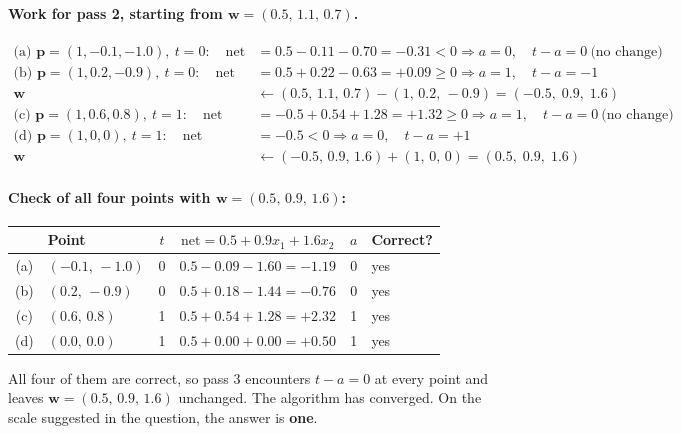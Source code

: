 \documentclass[11pt]{article}
\newcommand{\net}{\mathrm{net}}
\newcommand{\bw}{\mathbf{w}}
\newcommand{\bp}{\mathbf{p}}
\begin{document}
\paragraph{Work for pass 2, starting from $\bw = (0.5,\,1.1,\,0.7)$.}

\begin{align*}
\text{(a) } \bp=(1,-0.1,-1.0),\ t=0:\quad
\net &= 0.5 - 0.11 - 0.70 = -0.31 < 0 \Rightarrow a=0,\quad t-a=0 \ \text{(no change)}\\[4pt]
\text{(b) } \bp=(1,0.2,-0.9),\ t=0:\quad
\net &= 0.5 + 0.22 - 0.63 = +0.09 \ge 0 \Rightarrow a=1,\quad t-a=-1 \\
\bw &\leftarrow (0.5,\,1.1,\,0.7) - (1,\,0.2,\,-0.9) = (-0.5,\;0.9,\;1.6)\\[4pt]
\text{(c) } \bp=(1,0.6,0.8),\ t=1:\quad
\net &= -0.5 + 0.54 + 1.28 = +1.32 \ge 0 \Rightarrow a=1,\quad t-a=0 \ \text{(no change)}\\[4pt]
\text{(d) } \bp=(1,0,0),\ t=1:\quad
\net &= -0.5 < 0 \Rightarrow a=0,\quad t-a=+1 \\
\bw &\leftarrow (-0.5,\,0.9,\,1.6) + (1,\,0,\,0) = \mathbf{(0.5,\;0.9,\;1.6)}
\end{align*}

\paragraph{Check of all four points with $\bw = (0.5,\,0.9,\,1.6)$:}

\begin{table}[H]
\centering
\begin{tabular}{clcccl}
\toprule
& Point & $t$ & $\net = 0.5 + 0.9x_1 + 1.6x_2$ & $a$ & Correct? \\
\midrule
(a) & $(-0.1,\,-1.0)$ & 0 & $0.5 - 0.09 - 1.60 = -1.19$ & 0 & yes \\
(b) & $(0.2,\,-0.9)$  & 0 & $0.5 + 0.18 - 1.44 = -0.76$ & 0 & yes \\
(c) & $(0.6,\,0.8)$   & 1 & $0.5 + 0.54 + 1.28 = +2.32$ & 1 & yes \\
(d) & $(0.0,\,0.0)$   & 1 & $0.5 + 0.00 + 0.00 = +0.50$ & 1 & yes \\
\bottomrule
\end{tabular}
\end{table}

All four of them are correct, so pass 3 encounters $t - a = 0$ at every point and leaves
$\bw = (0.5,\,0.9,\,1.6)$ unchanged. The algorithm has converged. On the scale suggested in
the question, the answer is \textbf{one}.
\end{document}
